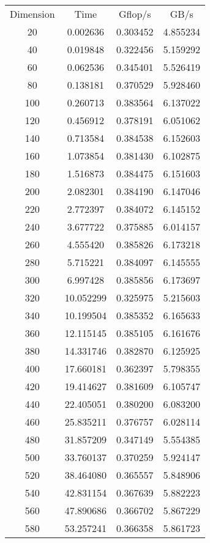 \documentclass[titlepage]{article}
\begin{document}
\begin{tabular}{ c c c c }
Dimension  &    Time   & Gflop/s  &   GB/s   \\
        20 &  0.002636 & 0.303452 & 4.855234 \\
        40 &  0.019848 & 0.322456 & 5.159292 \\
        60 &  0.062536 & 0.345401 & 5.526419 \\
        80 &  0.138181 & 0.370529 & 5.928460 \\
       100 &  0.260713 & 0.383564 & 6.137022 \\
       120 &  0.456912 & 0.378191 & 6.051062 \\
       140 &  0.713584 & 0.384538 & 6.152603 \\
       160 &  1.073854 & 0.381430 & 6.102875 \\
       180 &  1.516873 & 0.384475 & 6.151603 \\
       200 &  2.082301 & 0.384190 & 6.147046 \\
       220 &  2.772397 & 0.384072 & 6.145152 \\
       240 &  3.677722 & 0.375885 & 6.014157 \\
       260 &  4.555420 & 0.385826 & 6.173218 \\
       280 &  5.715221 & 0.384097 & 6.145555 \\
       300 &  6.997428 & 0.385856 & 6.173697 \\
       320 & 10.052299 & 0.325975 & 5.215603 \\
       340 & 10.199504 & 0.385352 & 6.165633 \\
       360 & 12.115145 & 0.385105 & 6.161676 \\
       380 & 14.331746 & 0.382870 & 6.125925 \\
       400 & 17.660181 & 0.362397 & 5.798355 \\
       420 & 19.414627 & 0.381609 & 6.105747 \\
       440 & 22.405051 & 0.380200 & 6.083200 \\
       460 & 25.835211 & 0.376757 & 6.028114 \\
       480 & 31.857209 & 0.347149 & 5.554385 \\
       500 & 33.760137 & 0.370259 & 5.924147 \\
       520 & 38.464080 & 0.365557 & 5.848906 \\
       540 & 42.831154 & 0.367639 & 5.882223 \\
       560 & 47.890686 & 0.366702 & 5.867229 \\
       580 & 53.257241 & 0.366358 & 5.861723
\end{tabular}
\end{document}
